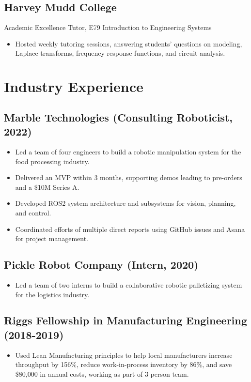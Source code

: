 \documentclass{cv_style}
\begin{document}
\subsection{Harvey Mudd College}
\begin{description}[leftmargin=\parindent,labelindent=\parindent]
    \item[AY 2017-18 \& AY 2018-19] Academic Excellence Tutor, E79 Introduction to Engineering Systems
        \begin{itemize}
            \item Hosted weekly tutoring sessions, answering students' questions on modeling, Laplace transforms, frequency response functions, and circuit analysis.
        \end{itemize}
\end{description}

\section{Industry Experience}
\subsection{Marble Technologies (Consulting Roboticist, 2022)}
\begin{itemize}[itemsep=-0.1em]
    \item Led a team of four engineers to build a robotic manipulation system for the food processing industry.
    \item Delivered an MVP within 3 months, supporting demos leading to pre-orders and a \$10M Series A.
    \item Developed ROS2 system architecture and subsystems for vision, planning, and control.
    \item Coordinated efforts of multiple direct reports using GitHub issues and Asana for project management.
\end{itemize}

\subsection{Pickle Robot Company (Intern, 2020)}
\begin{itemize}[itemsep=-0.1em]
    \item Led a team of two interns to build a collaborative robotic palletizing system for the logistics industry.
\end{itemize}

\subsection{Riggs Fellowship in Manufacturing Engineering (2018-2019)}
\begin{itemize}[itemsep=-0.1em]
    \item Used Lean Manufacturing principles to help local manufacturers increase throughput by 156\%, reduce work-in-process inventory by 86\%, and save \$80,000 in annual costs, working as part of 3-person team.
\end{itemize}
\end{document}

